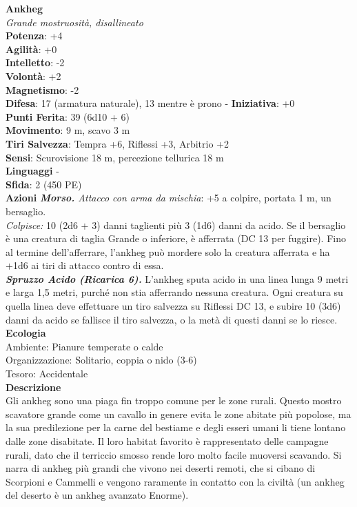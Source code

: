 \begin{multicols}{2}
\medskip\textbf{Ankheg}\\
\emph{Grande mostruosità, disallineato}\\
\textbf{Potenza}: +4\\
\textbf{Agilità}: +0\\
\textbf{Intelletto}: -2\\
\textbf{Volontà}: +2\\
\textbf{Magnetismo}: -2\\
\textbf{Difesa}: 17 (armatura naturale), 13 mentre è prono - \textbf{Iniziativa}: +0\\
\textbf{Punti Ferita}: 39 (6d10 + 6)\\
\textbf{Movimento}: 9 m, scavo 3 m\\
\textbf{Tiri Salvezza}: Tempra +6, Riflessi +3, Arbitrio +2\\
\textbf{Sensi}: Scurovisione 18 m, percezione tellurica 18 m\\
\textbf{Linguaggi} -\\
\textbf{Sfida}: 2 (450 PE)\smallskip\\
\smallskip\textbf{Azioni}
\emph{\textbf{Morso.} Attacco con arma da mischia}: +5 a colpire, portata 1 m, un bersaglio.\\
\emph{Colpisce:} 10 (2d6 + 3) danni taglienti più 3 (1d6) danni da acido. Se il bersaglio è una creatura di taglia Grande o inferiore, è afferrata (DC 13 per fuggire). Fino al termine dell'afferrare, l'ankheg può mordere solo la creatura afferrata e ha +1d6 ai tiri di attacco contro di essa.\\
\emph{\textbf{Spruzzo Acido (Ricarica 6).}} L'ankheg sputa acido in una linea lunga 9 metri e larga 1,5 metri, purché non stia afferrando nessuna creatura. Ogni creatura su quella linea deve effettuare un tiro salvezza su Riflessi DC 13, e subire 10 (3d6) danni da acido se fallisce il tiro salvezza, o la metà di questi danni se lo riesce.\\
\textbf{Ecologia}\\
Ambiente: Pianure temperate o calde\\
Organizzazione: Solitario, coppia o nido (3-6)\\
Tesoro: Accidentale\\
\textbf{Descrizione}\\
Gli ankheg sono una piaga fin troppo comune per le zone rurali. Questo mostro scavatore grande come un cavallo in genere evita le zone abitate più popolose, ma la sua predilezione per la carne del bestiame e degli esseri umani li tiene lontano dalle zone disabitate. Il loro habitat favorito è rappresentato delle campagne rurali, dato che il terriccio smosso rende loro molto facile muoversi scavando. Si narra di ankheg più grandi che vivono nei deserti remoti, che si cibano di Scorpioni e Cammelli e vengono raramente in contatto con la civiltà (un ankheg del deserto è un ankheg avanzato Enorme).\\

\end{multicols}
